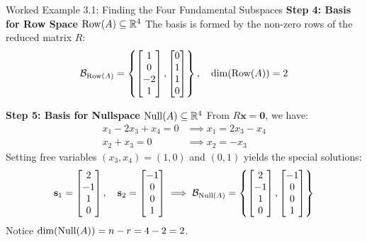 \begin{examplebox}{Worked Example 3.1: Finding the Four Fundamental Subspaces}
\textbf{Step 4: Basis for Row Space $\operatorname{Row}(A) \subseteq \mathbb{R}^4$}
The basis is formed by the non-zero rows of the reduced matrix $R$:
\begin{equation*}
\mathcal{B}_{\operatorname{Row}(A)} = \left\{ \begin{bmatrix} 1 \\ 0 \\ -2 \\ 1 \end{bmatrix}, \begin{bmatrix} 0 \\ 1 \\ 1 \\ 0 \end{bmatrix} \right\}, \quad \dim(\operatorname{Row}(A)) = 2
\end{equation*}

\textbf{Step 5: Basis for Nullspace $\operatorname{Null}(A) \subseteq \mathbb{R}^4$}
From $R\mathbf{x} = \mathbf{0}$, we have:
\begin{align*}
x_1 - 2x_3 + x_4 = 0 &\implies x_1 = 2x_3 - x_4 \\
x_2 + x_3 = 0 &\implies x_2 = -x_3
\end{align*}
Setting free variables $(x_3, x_4) = (1, 0)$ and $(0, 1)$ yields the special solutions:
\begin{equation*}
\mathbf{s}_1 = \begin{bmatrix} 2 \\ -1 \\ 1 \\ 0 \end{bmatrix}, \quad \mathbf{s}_2 = \begin{bmatrix} -1 \\ 0 \\ 0 \\ 1 \end{bmatrix} \implies \mathcal{B}_{\operatorname{Null}(A)} = \left\{ \begin{bmatrix} 2 \\ -1 \\ 1 \\ 0 \end{bmatrix}, \begin{bmatrix} -1 \\ 0 \\ 0 \\ 1 \end{bmatrix} \right\}
\end{equation*}
Notice $\dim(\operatorname{Null}(A)) = n - r = 4 - 2 = 2$.


\end{examplebox}
